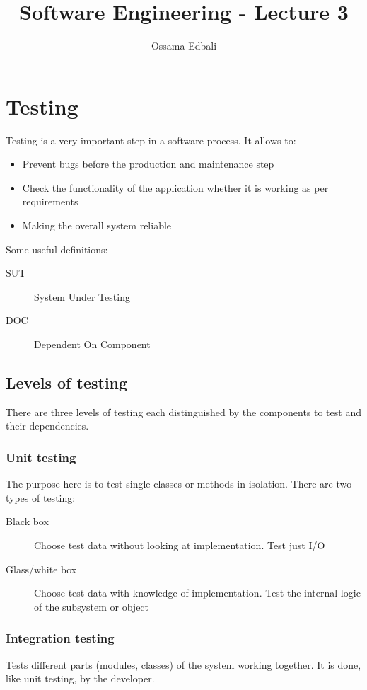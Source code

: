 \documentclass{article}
\title{Software Engineering - Lecture 3}
\author{Ossama Edbali}
\begin{document}
	
	\maketitle	
	
	\section{Testing}	
	Testing is a very important step in a software process. It allows to:
	\begin{itemize}
		\item Prevent bugs before the production and maintenance step
		\item Check the functionality of the application whether it is working as per requirements
		\item Making the overall system reliable
	\end{itemize}
	
	Some useful definitions:
	\begin{description}
		\item[SUT] System Under Testing
		\item[DOC] Dependent On Component
	\end{description}		
	
	\subsection*{Levels of testing}
	There are three levels of testing each distinguished by the components to test and their dependencies.
	
	\subsubsection*{Unit testing}	
	The purpose here is to test single classes or methods in isolation.
	There are two types of testing:
	\begin{description}
		\item[Black box] Choose test data without looking at implementation. Test just I/O
		\item[Glass/white box] Choose test data with knowledge of implementation.
		Test the internal logic of the subsystem or object
	\end{description}
	
	\subsubsection*{Integration testing}
	Tests different parts (modules, classes) of the system working together. It is done, like unit testing,
	by the developer.	
	
\end{document}
